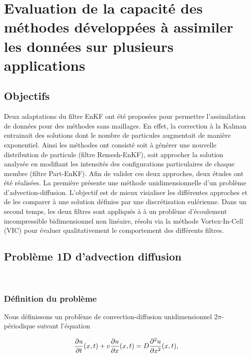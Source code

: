 
\chapter{Evaluation de la capacité des méthodes développées à assimiler les données sur plusieurs applications}
\newcommand{\xx}{x_0 = 0.02}
\newcommand{\sigx}{\sigma_0^2 = 0.5}
\newcommand{\npart}{$N_{part} = 100$}
\newcommand{\ngrid}{$N_{grid} = 100$}
\newcommand{\sigmaY}{0.05}

\section{Objectifs}

Deux adaptations du filtre EnKF ont été proposées pour permettre l'assimilation de données pour des méthodes sans maillages. En effet, la correction à la Kalman entrainait des solutions dont le nombre de particules augmentait de manière exponentiel. Ainsi les méthodes ont consisté soit à générer une nouvelle distribution de particule (filtre Remesh-EnKF), soit approcher la solution analysée en modifiant les intensités des configurations particulaires de chaque membre (filtre Part-EnKF). Afin de valider ces deux approches, deux études ont été réalisées. La première présente une méthode unidimensionnelle d'un problème d'advection-diffusion. L'objectif est de mieux visialiser les différentes approches et de les comparer à une solution définies par une discrétisation eulérienne. Dans un second temps, les deux filtres sont appliqués à à un problème d'écoulement incompressible bidimensionnel non linéaire, résolu via la méthode Vortex-In-Cell (VIC) pour évaluer qualitativement le comportement des différents filtres.

\section{Problème 1D d'advection diffusion}~\label{sec:App_1D}

\subsection{Définition du problème}
Nous définissons un problème de convection-diffusion unidimensionnel $2\pi$-périodique suivant l'équation

\begin{equation*}
    \frac{\partial u}{\partial t}(x,t) + v \frac{\partial u}{\partial x}(x,t) = D \frac{\partial^2 u}{\partial x^2}(x,t),
\end{equation*}

